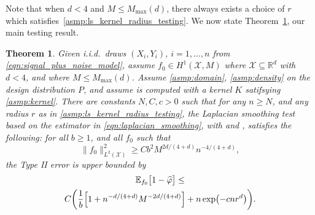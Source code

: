\documentclass[twoside]{article}
\newcommand{\Reals}{\mathbb{R}}
\newcommand{\1}{\mathbf{1}}
\newcommand{\Rd}{\Reals^d}
\newcommand{\Xset}{\mathcal{X}}
\newcommand{\Leb}{L}
\newcommand{\Ebb}{\mathbb{E}}
\newcommand{\wh}[1]{\widehat{#1}}
\newtheorem{theorem}{Theorem}
\theoremstyle{definition}
\theoremstyle{remark}
\begin{document}
Note that when $d < 4$ and $M \leq M_{\max}(d)$, there always exists a choice of $r$ which satisfies~\ref{asmp:ls_kernel_radius_testing}. 
We now state Theorem~\ref{thm:laplacian_smoothing_testing}, our main testing result.
\begin{theorem}
	\label{thm:laplacian_smoothing_testing}
  Given i.i.d.\ draws $(X_i,Y_i)$, $i=1,\ldots,n$ from \eqref{eqn:signal_plus_noise_model}, assume $f_0 \in H^1(\Xset,M)$ where $\Xset \subseteq \Rd$ with $d < 4$, and where $M \leq M_{\max}(d)$. Assume \ref{asmp:domain}, \ref{asmp:density} on the design distribution $P$, and assume  is computed with a kernel $K$ satifsying \ref{asmp:kernel}. There are constants $N,C,c>0$ such that for any $n \geq N$, and any radius $r$ as in \ref{asmp:ls_kernel_radius_testing}, the Laplacian smoothing test \smash{$\wh{\varphi}$} based on the estimator \smash{$\wh{f}$} in \eqref{eqn:laplacian_smoothing}, with  and , satisfies the following: for all $b \geq 1$, and all $f_0$ such that
	\begin{equation}
	\label{eqn:laplacian_smoothing_testing}
	\bigl\|f_0\bigr\|_{\Leb^2(\Xset)}^2 \geq C b^2 M^{2d/(4 + d)} n^{-4/(4 + d)},
	\end{equation} 
	the Type II error is upper bounded by
	\begin{multline*}
	\Ebb_{f_0}\bigl[1 - \wh{\varphi} \bigr] \leq \\
	C\biggl(\frac{1}{b}\Bigl[1 + n^{-d/(4 + d)}M^{-2d/(4 + d)}\Bigr] + n\exp\bigl(-cnr^d\bigr)\biggr).
	\end{multline*}
\end{theorem}
\end{document}
